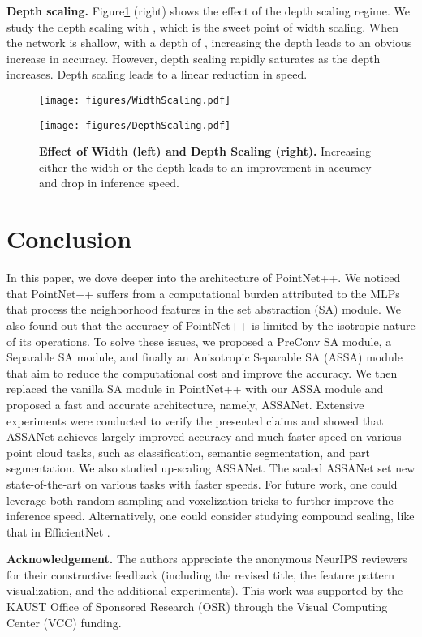 \documentclass{article}
\newcommand{\figLabel}{Figure\xspace}
\newcommand{\mysection}[1]{\vspace{3pt}\noindent\textbf{#1.}}
\begin{document}
\mysection{Depth scaling} \figLabel \ref{fig:scaling} (right) shows the effect of the depth scaling regime. We study the depth scaling with , which is the sweet point of width scaling. When the network is shallow, with a depth of , increasing the depth leads to an obvious increase in accuracy. However, depth scaling rapidly saturates as the depth increases. Depth scaling leads to a linear reduction in speed. 

\begin{figure}[!htb]
    \centering
\begin{minipage}{.48\textwidth}
    \texttt{[image: figures/WidthScaling.pdf]}
\end{minipage}
\begin{minipage}{.48\textwidth}
      \texttt{[image: figures/DepthScaling.pdf]}
\end{minipage}
    \caption{\textbf{Effect of Width (left) and Depth Scaling (right).} Increasing either the width or the depth leads to an improvement in accuracy and drop in inference speed. }
    \label{fig:scaling}
\end{figure}
 \section{Conclusion}\label{sec:conclusion}
In this paper, we dove deeper into the architecture of PointNet++. We noticed that PointNet++ suffers from a computational burden attributed to the MLPs that process the neighborhood features in the set abstraction (SA) module. We also found out that the accuracy of PointNet++ is limited by the isotropic nature of its operations. To solve these issues, we proposed a PreConv SA module, a Separable SA module, and finally an Anisotropic Separable SA (ASSA) module that aim to reduce the computational cost and improve the accuracy. We then replaced the vanilla SA module in PointNet++ with our ASSA module and proposed a fast and accurate architecture, namely, ASSANet. Extensive experiments were conducted to verify the presented claims and showed that ASSANet achieves largely improved accuracy and much faster speed on various point cloud tasks, such as classification, semantic segmentation, and part segmentation. We also studied up-scaling ASSANet. The scaled ASSANet set new state-of-the-art on various tasks with faster speeds. For future work, one could leverage both random sampling \cite{Hu2020RandLANetES} and voxelization tricks \cite{Liu2019PointVoxelCF, Xu2020GridGCNFF} to further improve the inference speed. Alternatively, one could consider studying compound scaling, like that in EfficientNet \cite{Tan19EfficientNet}. 
 

\mysection{Acknowledgement}
The authors appreciate the anonymous NeurIPS reviewers for their constructive feedback (including the revised title, the feature pattern visualization, and the additional experiments). This work was supported by the KAUST Office of Sponsored Research (OSR)  through the Visual Computing Center (VCC) funding. {\small


}
\end{document}
